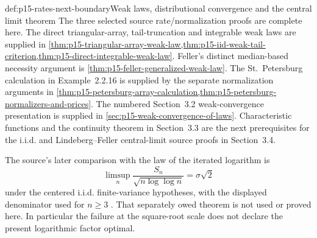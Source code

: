 \begin{proofboundary}{def:p15-rates-next-boundary}{Weak laws, distributional convergence and the central limit theorem}
The three selected source rate/normalization proofs are complete here.
The direct triangular-array, tail-truncation and integrable weak laws
are supplied in \cref{thm:p15-triangular-array-weak-law,thm:p15-iid-weak-tail-criterion,thm:p15-direct-integrable-weak-law}.
Feller's distinct median-based necessity argument is
\cref{thm:p15-feller-generalized-weak-law}.
The St.~Petersburg calculation in Example~2.2.16 is supplied by the
separate normalization arguments in
\cref{thm:p15-petersburg-array-calculation,thm:p15-petersburg-normalizers-and-prices}.
The numbered Section~3.2 weak-convergence presentation is supplied in
\cref{sec:p15-weak-convergence-of-laws}.
Characteristic functions and the continuity theorem in Section~3.3
are the next prerequisites for the i.i.d. and Lindeberg--Feller
central-limit source proofs in Section~3.4.

The source's later comparison with the law of the iterated logarithm is
\[
 \limsup_n\frac{S_n}{\sqrt{n\log\log n}}=\sigma\sqrt2
\]
under the centered i.i.d. finite-variance hypotheses, with the displayed
denominator used for \(n\geq3\)
\cite[p.~87; Theorem~8.5.2]{DurrettPTEAuthor2019}. That separately
owed theorem is not used or proved here. In particular the failure
at the square-root scale does not declare the present logarithmic
factor optimal.
\end{proofboundary}
